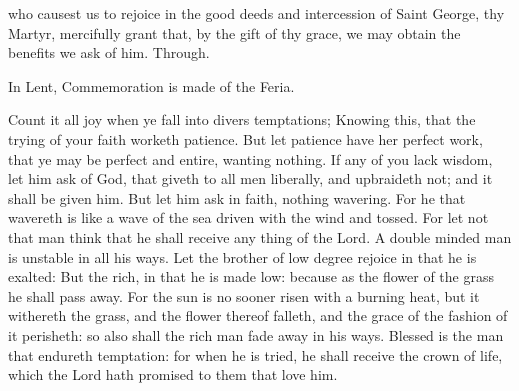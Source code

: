 \introit
\collect
{} who causest us to rejoice in the good deeds and intercession of Saint George, thy Martyr, mercifully grant that, by the gift of thy grace, we may obtain the benefits we ask of him. Through.
\begin{rubric}
    In Lent, Commemoration is made of the Feria.%
\end{rubric}
 Count it all joy when ye fall into divers temptations; Knowing this, that the trying of your faith worketh patience. But let patience have her perfect work, that ye may be perfect and entire, wanting nothing. If any of you lack wisdom, let him ask of God, that giveth to all men liberally, and upbraideth not; and it shall be given him. But let him ask in faith, nothing wavering. For he that wavereth is like a wave of the sea driven with the wind and tossed. For let not that man think that he shall receive any thing of the Lord. A double minded man is unstable in all his ways. Let the brother of low degree rejoice in that he is exalted: But the rich, in that he is made low: because as the flower of the grass he shall pass away. For the sun is no sooner risen with a burning heat, but it withereth the grass, and the flower thereof falleth, and the grace of the fashion of it perisheth: so also shall the rich man fade away in his ways. Blessed is the man that endureth temptation: for when he is tried, he shall receive the crown of life, which the Lord hath promised to them that love him.

